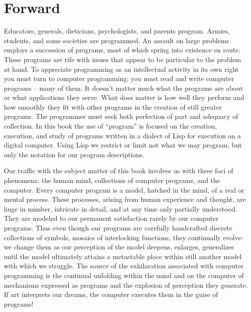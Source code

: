 \chapter{Forward}

Educators, generals, dieticians, psychologists, and parents program.
Armies, students, and some societies are programmed.  An assault on
large problems employs a succession of programs, most of which spring
into existence en route.  These programs are rife with issues that
appear to be particular to the problem at hand.  To appreciate
programming as an intellectual activity in its own right you must turn
to computer programming; you must read and write computer
programs -- many of them.  It doesn't matter much what the programs are
about or what applications they serve.  What does matter is how well
they perform and how smoothly they fit with other programs in the
creation of still greater programs.  The programmer must seek both
perfection of part and adequacy of collection.  In this book the use
of ``program'' is focused on the creation, execution, and study of
programs written in a dialect of Lisp for execution on a digital
computer.  Using Lisp we restrict or limit not what we may program,
but only the notation for our program descriptions.

Our traffic with the subject matter of this book involves us with
three foci of phenomena: the human mind, collections of computer
programs, and the computer.  Every computer program is a model,
hatched in the mind, of a real or mental process.  These processes,
arising from human experience and thought, are huge in number,
intricate in detail, and at any time only partially understood.  They
are modeled to our permanent satisfaction rarely by our computer
programs.  Thus even though our programs are carefully handcrafted
discrete collections of symbols, mosaics of interlocking functions,
they continually evolve: we change them as our perception of the model
deepens, enlarges, generalizes until the model ultimately attains a
metastable place within still another model with which we struggle.
The source of the exhilaration associated with computer programming is
the continual unfolding within the mind and on the computer of
mechanisms expressed as programs and the explosion of perception they
generate.  If art interprets our dreams, the computer executes them in
the guise of programs!

